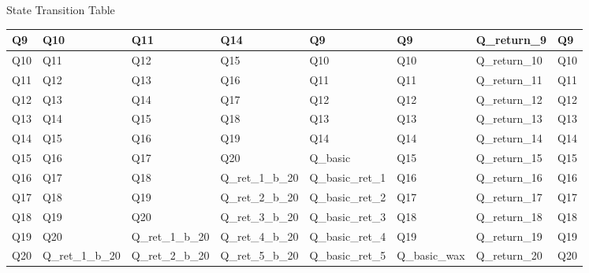 \documentclass[10pt, a4paper]{article}
\begin{document}
\begin{section}{State Transition Table}
\begin{landscape}
\begin{longtable}[c]{llllllll}
Q9   & Q10              & Q11              & Q14              & Q9               & Q9            & Q\_return\_9  & Q9   \\ \hline
Q10  & Q11              & Q12              & Q15              & Q10              & Q10           & Q\_return\_10 & Q10  \\ \hline
Q11  & Q12              & Q13              & Q16              & Q11              & Q11           & Q\_return\_11 & Q11  \\ \hline
Q12  & Q13              & Q14              & Q17              & Q12              & Q12           & Q\_return\_12 & Q12  \\ \hline
Q13  & Q14              & Q15              & Q18              & Q13              & Q13           & Q\_return\_13 & Q13  \\ \hline
Q14  & Q15              & Q16              & Q19              & Q14              & Q14           & Q\_return\_14 & Q14  \\ \hline
Q15  & Q16              & Q17              & Q20              & Q\_basic         & Q15           & Q\_return\_15 & Q15  \\ \hline
Q16  & Q17              & Q18              & Q\_ret\_1\_b\_20 & Q\_basic\_ret\_1 & Q16           & Q\_return\_16 & Q16  \\ \hline
Q17  & Q18              & Q19              & Q\_ret\_2\_b\_20 & Q\_basic\_ret\_2 & Q17           & Q\_return\_17 & Q17  \\ \hline
Q18  & Q19              & Q20              & Q\_ret\_3\_b\_20 & Q\_basic\_ret\_3 & Q18           & Q\_return\_18 & Q18  \\ \hline
Q19  & Q20              & Q\_ret\_1\_b\_20 & Q\_ret\_4\_b\_20 & Q\_basic\_ret\_4 & Q19           & Q\_return\_19 & Q19  \\ \hline
Q20  & Q\_ret\_1\_b\_20 & Q\_ret\_2\_b\_20 & Q\_ret\_5\_b\_20 & Q\_basic\_ret\_5 & Q\_basic\_wax & Q\_return\_20 & Q20  \\ \hline
\end{longtable}
\end{landscape}

\newpage


\end{section}
\end{document}
